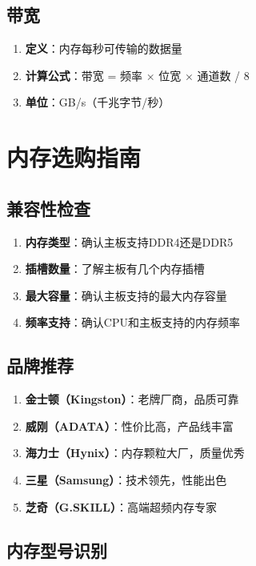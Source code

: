 \documentclass[12pt,UTF8]{ctexbook}
\begin{document}
\section{带宽}

\begin{enumerate}
    \item \textbf{定义}：内存每秒可传输的数据量
    \item \textbf{计算公式}：带宽 = 频率 × 位宽 × 通道数 / 8
    \item \textbf{单位}：GB/s（千兆字节/秒）
\end{enumerate}

\chapter{内存选购指南}

\section{兼容性检查}

\begin{enumerate}
    \item \textbf{内存类型}：确认主板支持DDR4还是DDR5
    \item \textbf{插槽数量}：了解主板有几个内存插槽
    \item \textbf{最大容量}：确认主板支持的最大内存容量
    \item \textbf{频率支持}：确认CPU和主板支持的内存频率
\end{enumerate}

\section{品牌推荐}

\begin{enumerate}
    \item \textbf{金士顿（Kingston）}：老牌厂商，品质可靠
    \item \textbf{威刚（ADATA）}：性价比高，产品线丰富
    \item \textbf{海力士（Hynix）}：内存颗粒大厂，质量优秀
    \item \textbf{三星（Samsung）}：技术领先，性能出色
    \item \textbf{芝奇（G.SKILL）}：高端超频内存专家
\end{enumerate}

\section{内存型号识别}
\end{document}

